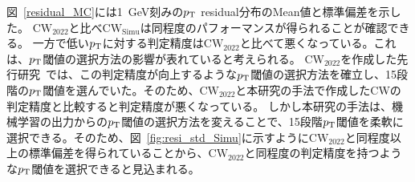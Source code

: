 図~\ref{residual_MC}には1~GeV刻みの$p_{\rm{T}}$ residual分布のMean値と標準偏差を示した。
$\mathrm{CW_{2022}}$と比べ$\mathrm{CW_{Simu}}$は同程度のパフォーマンスが得られることが確認できる。
一方で低い$p_{\rm{T}}$に対する判定精度は$\mathrm{CW_{2022}}$と比べて悪くなっている。これは、$p_{\rm{T}}$閾値の選択方法の影響が表れていると考えられる。
$\mathrm{CW_{2022}}$を作成した先行研究~\cite{article:shiomi-mron}では、この判定精度が向上するような$p_{\rm{T}}$閾値の選択方法を確立し、15段階の$p_{\rm{T}}$閾値を選んでいた。そのため、$\mathrm{CW_{2022}}$と本研究の手法で作成したCWの判定精度と比較すると判定精度が悪くなっている。
しかし本研究の手法は、機械学習の出力からの$p_{\rm{T}}$閾値の選択方法を変えることで、15段階$p_{\rm{T}}$閾値を柔軟に選択できる。そのため、図~\ref{fig:resi_std_Simu}に示すように$\mathrm{CW_{2022}}$と同程度以上の標準偏差を得られていることから、$\mathrm{CW_{2022}}$と同程度の判定精度を持つような$p_{\rm{T}}$閾値を選択できると見込まれる。


